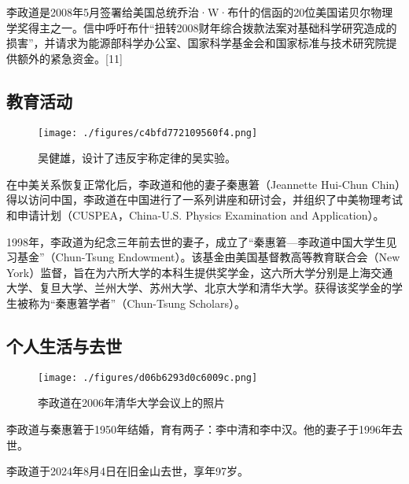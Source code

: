 李政道是2008年5月签署给美国总统乔治·W·布什的信函的20位美国诺贝尔物理学奖得主之一。信中呼吁布什“扭转2008财年综合拨款法案对基础科学研究造成的损害”，并请求为能源部科学办公室、国家科学基金会和国家标准与技术研究院提供额外的紧急资金。[11]
\subsection{教育活动}
\begin{figure}[ht]
\centering
\texttt{[image: ./figures/c4bfd772109560f4.png]}
\caption{吴健雄，设计了违反宇称定律的吴实验。} \label{fig_Tsung_2}
\end{figure}
在中美关系恢复正常化后，李政道和他的妻子秦惠䇹（Jeannette Hui-Chun Chin）得以访问中国，李政道在中国进行了一系列讲座和研讨会，并组织了中美物理考试和申请计划（CUSPEA，China-U.S. Physics Examination and Application）。

1998年，李政道为纪念三年前去世的妻子，成立了“秦惠䇹—李政道中国大学生见习基金”（Chun-Tsung Endowment）。该基金由美国基督教高等教育联合会（New York）监督，旨在为六所大学的本科生提供奖学金，这六所大学分别是上海交通大学、复旦大学、兰州大学、苏州大学、北京大学和清华大学。获得该奖学金的学生被称为“秦惠䇹学者”（Chun-Tsung Scholars）。
\subsection{个人生活与去世}
\begin{figure}[ht]
\centering
\texttt{[image: ./figures/d06b6293d0c6009c.png]}
\caption{李政道在2006年清华大学会议上的照片} \label{fig_Tsung_3}
\end{figure}
李政道与秦惠䇹于1950年结婚，育有两子：李中清和李中汉。他的妻子于1996年去世。

李政道于2024年8月4日在旧金山去世，享年97岁。
